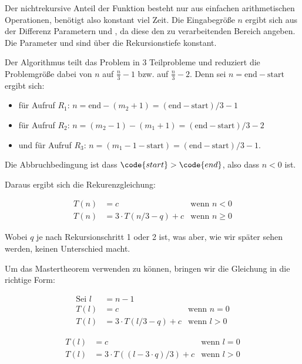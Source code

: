 \documentclass[parskip=half,a4paper]{scrartcl}
\begin{document}
Der nichtrekursive Anteil der Funktion besteht nur aus einfachen arithmetischen Operationen, benötigt also konstant  viel Zeit. Die Eingabegröße $n$ ergibt sich aus der Differenz Parametern  und , da diese den zu verarbeitenden Bereich angeben. Die Parameter  und  sind über die Rekursionstiefe konstant.

Der Algorithmus teilt das Problem in 3 Teilprobleme und reduziert die Problemgröße dabei von $n$ auf $\frac{n}{3} - 1$ bzw. auf $\frac{n}{3} - 2$. Denn sei $n = \text{end} - \text{start}$ ergibt sich:
\begin{itemize}
	\item für Aufruf $R_1$: $n = \text{end} - (m_2 + 1) = (\text{end} -
	\text{start}) / 3 - 1$

	\item für Aufruf $R_2$: $n = (m_2 - 1) - (m_1 + 1) = (\text{end} - \text{start}) / 3 - 2$
	\item und für Aufruf $R_3$: $n = (m_1 - 1 - \text{start}) = (\text{end} - \text{start}) / 3 - 1$.
\end{itemize}

Die Abbruchbedingung ist dass $\code{start} > \code{end}$, also dass $n < 0$ ist.

Daraus ergibt sich die Rekurenzgleichung:

\begin{equation*}
\begin{aligned}
T(n) & = c & \text{wenn $n < 0$}  \\
T(n) & = 3 \cdot T(n / 3 - q) + c & \text{wenn $n \ge 0$}
\end{aligned}
\end{equation*}

Wobei $q$ je nach Rekursionschritt 1 oder 2 ist, was aber, wie wir später sehen werden, keinen Unterschied macht.

Um das Mastertheorem verwenden zu können, bringen wir die Gleichung in die richtige Form:


\begin{equation*}
\begin{aligned}
\text{Sei $l$} & = n - 1&\\
T(l) & = c & \text{wenn $n = 0$}  \\
T(l) & = 3 \cdot T(l / 3 - q) + c & \text{wenn $l > 0$}
\end{aligned}
\end{equation*}

\begin{equation*}
\begin{aligned}
T(l) & = c & \text{wenn $l = 0$} \\
T(l) & = 3 \cdot T((l - 3 \cdot q) / 3) + c & \text{wenn $l > 0$}
\end{aligned}
\end{equation*}
\end{document}
